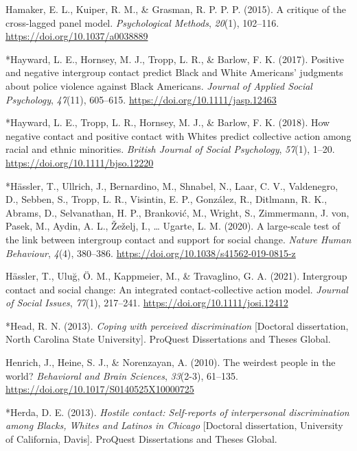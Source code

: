 \documentclass[12pt, letterpaper]{article}
\begin{document}
\leavevmode\hypertarget{ref-hamaker_critique_2015}{}%
Hamaker, E. L., Kuiper, R. M., \& Grasman, R. P. P. P. (2015). A
critique of the cross-lagged panel model. \emph{Psychological Methods},
\emph{20}(1), 102--116. \url{https://doi.org/10.1037/a0038889}

\leavevmode\hypertarget{ref-4003}{}%
*Hayward, L. E., Hornsey, M. J., Tropp, L. R., \& Barlow, F. K. (2017).
Positive and negative intergroup contact predict Black and White
Americans' judgments about police violence against Black Americans.
\emph{Journal of Applied Social Psychology}, \emph{47}(11), 605--615.
\url{https://doi.org/10.1111/jasp.12463}

\leavevmode\hypertarget{ref-2309}{}%
*Hayward, L. E., Tropp, L. R., Hornsey, M. J., \& Barlow, F. K. (2018).
How negative contact and positive contact with Whites predict collective
action among racial and ethnic minorities. \emph{British Journal of
Social Psychology}, \emph{57}(1), 1--20.
\url{https://doi.org/10.1111/bjso.12220}

\leavevmode\hypertarget{ref-3054}{}%
*Hässler, T., Ullrich, J., Bernardino, M., Shnabel, N., Laar, C. V.,
Valdenegro, D., Sebben, S., Tropp, L. R., Visintin, E. P., González, R.,
Ditlmann, R. K., Abrams, D., Selvanathan, H. P., Branković, M., Wright,
S., Zimmermann, J. von, Pasek, M., Aydin, A. L., Žeželj, I., \ldots{}
Ugarte, L. M. (2020). A large-scale test of the link between intergroup
contact and support for social change. \emph{Nature Human Behaviour},
\emph{4}(4), 380--386. \url{https://doi.org/10.1038/s41562-019-0815-z}

\leavevmode\hypertarget{ref-hassler_intergroup_2021}{}%
Hässler, T., Uluğ, Ö. M., Kappmeier, M., \& Travaglino, G. A. (2021).
Intergroup contact and social change: An integrated contact‐collective
action model. \emph{Journal of Social Issues}, \emph{77}(1), 217--241.
\url{https://doi.org/10.1111/josi.12412}

\leavevmode\hypertarget{ref-1407}{}%
*Head, R. N. (2013). \emph{Coping with perceived discrimination}
{[}Doctoral dissertation, North Carolina State University{]}. ProQuest
Dissertations and Theses Global.

\leavevmode\hypertarget{ref-henrich_weirdest_2010}{}%
Henrich, J., Heine, S. J., \& Norenzayan, A. (2010). The weirdest people
in the world? \emph{Behavioral and Brain Sciences}, \emph{33}(2-3),
61--135. \url{https://doi.org/10.1017/S0140525X10000725}

\leavevmode\hypertarget{ref-1494}{}%
*Herda, D. E. (2013). \emph{Hostile contact: Self-reports of
interpersonal discrimination among Blacks, Whites and Latinos in
Chicago} {[}Doctoral dissertation, University of California, Davis{]}.
ProQuest Dissertations and Theses Global.
\end{document}
